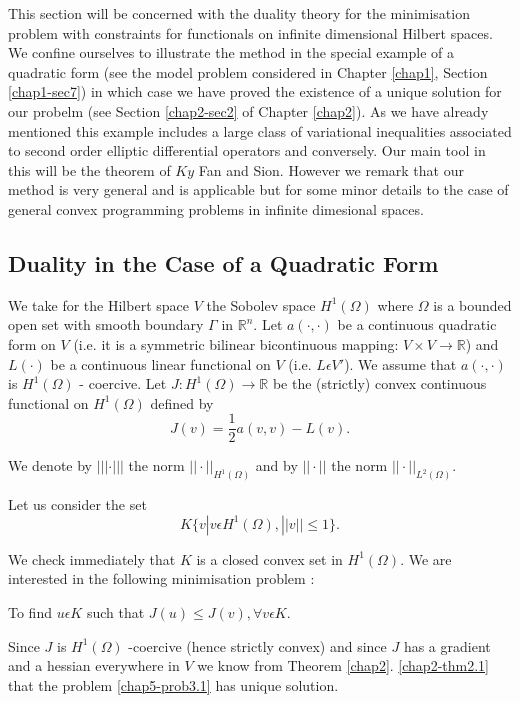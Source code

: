 This section will be concerned with the duality theory for the minimisation problem with constraints for functionals on infinite dimensional Hilbert spaces. We confine ourselves to illustrate the method in the special example of a quadratic form (see the model problem considered in Chapter \ref{chap1}, Section \ref{chap1-sec7}) in which case we have proved the existence of a unique solution for our probelm (see Section \ref{chap2-sec2} of Chapter \ref{chap2}). As we have already mentioned this example includes a large class of variational inequalities associated to second order elliptic differential operators and conversely. Our main tool in this will be the theorem of $Ky$ Fan and Sion. However we remark that our method is very general and is applicable but for some minor details to the case of general convex programming problems in infinite dimesional spaces.

\subsection{Duality in the Case of a Quadratic Form}\label{chap5-subsec3.1}\pageoriginale

We take for the Hilbert space $V$ the Sobolev space $H^{1} (\Omega)$ where $\Omega$ is a bounded open set with smooth boundary $\Gamma$ in $\mathbb{R}^{n}$. Let $a(\cdot ,  \cdot)$ be a continuous quadratic form on $V$ (i.e. it is a symmetric bilinear bicontinuous mapping: $V \times V \to \mathbb{R}$) and $L(\cdot)$ be a continuous linear functional on $V$ (i.e. $L \epsilon V'$). We assume that $a(\cdot , \cdot)$ is $H^{1} (\Omega)$ - coercive. Let $J : H^{1} (\Omega) \to \mathbb{R}$ be the (strictly) convex continuous functional on $H^{1} (\Omega)$ defined by
\begin{equation*}
J(v) = \frac{1}{2} a(v, v) -L(v).\tag{3.1}\label{chap5-eq3.1}
\end{equation*}

We denote by $||| \cdot |||$ the norm $|| \cdot ||_{H^{1} (\Omega)}$ and by $|| \cdot ||$ the norm $|| \cdot ||_{L^{2} (\Omega)}$.

Let us consider the set
\begin{equation*}
K \{v | v \epsilon H^{1} (\Omega), || v|| \leq 1 \}.\tag{3.2}\label{chap5-eq3.2}
\end{equation*}

We check immediately that $K$ is a closed convex set in $H^{1} (\Omega)$. We are interested in the following minimisation problem :

\begin{problem}\label{chap5-prob3.1}
To find $u \epsilon K$ such that $J(u) \leq J(v), \forall v \epsilon K$.

Since $J$ is $H^{1} (\Omega)$ -coercive (hence strictly convex) and since $J$ has a gradient and a hessian everywhere in $V$ we know from Theorem \ref{chap2}. \ref{chap2-thm2.1} that the problem \ref{chap5-prob3.1} has unique solution.
\end{problem}

